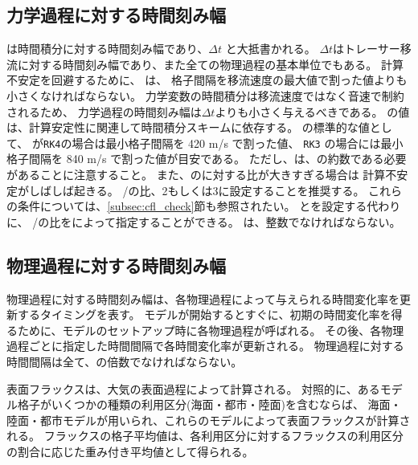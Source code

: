 \subsection{力学過程に対する時間刻み幅}

 は時間積分に対する時間刻み幅であり、$\Delta t$ と大抵書かれる。
$\Delta t$はトレーサー移流に対する時間刻み幅であり、また全ての物理過程の基本単位でもある。
計算不安定を回避するために、 は、
格子間隔を移流速度の最大値で割った値よりも小さくなければならない。
力学変数の時間積分は移流速度ではなく音速で制約されるため、
力学過程の時間刻み幅は$\Delta t$よりも小さく与えるべきである。
の値は、計算安定性に関連して時間積分スキームに依存する。
の標準的な値として、
が\verb|RK4|の場合は最小格子間隔を 420 m/s で割った値、
\verb|RK3| の場合には最小格子間隔を 840 m/s で割った値が目安である。
ただし、は、の約数である必要があることに注意すること。
また、のに対する比が大きすぎる場合は
計算不安定がしばしば起きる。
/の比、2もしくは3に設定することを推奨する。
これらの条件については、\ref{subsec:cfl_check}節も参照されたい。
とを設定する代わりに、
/の比をによって指定することができる。
は、整数でなければならない。

\subsection{物理過程に対する時間刻み幅}

物理過程に対する時間刻み幅は、各物理過程によって与えられる時間変化率を更新するタイミングを表す。
モデルが開始するとすぐに、初期の時間変化率を得るために、モデルのセットアップ時に各物理過程が呼ばれる。
その後、各物理過程ごとに指定した時間間隔で各時間変化率が更新される。
物理過程に対する時間間隔は全て、の倍数でなければならない。

表面フラックスは、大気の表面過程によって計算される。
対照的に、あるモデル格子がいくつかの種類の利用区分(海面・都市・陸面)を含むならば、
海面・陸面・都市モデルが用いられ、これらのモデルによって表面フラックスが計算される。
フラックスの格子平均値は、各利用区分に対するフラックスの利用区分の割合に応じた重み付き平均値として得られる。

